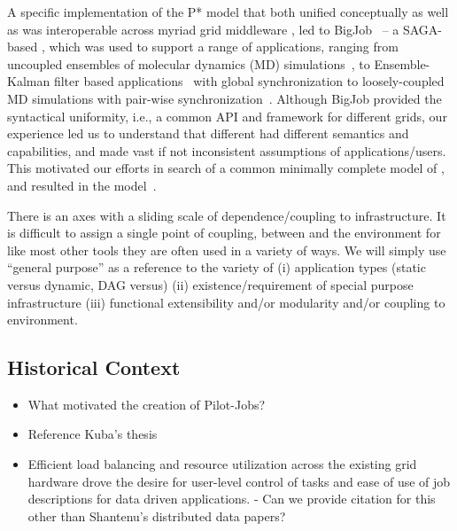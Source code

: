 \documentclass{sig-alternate}
\begin{document}
A specific implementation of the P* model that both unified
conceptually as well as was interoperable across myriad grid
middleware , led to 
BigJob~\cite{saga_bigjob_condor_cloud} -- a
SAGA-based \pilotjob, which was used to support a range of
applications, ranging from uncoupled ensembles of molecular dynamics
(MD) simulations~\cite{saga_bigjob_condor_cloud}, to Ensemble-Kalman
filter based applications~\cite{gmac09} with global synchronization to
loosely-coupled MD simulations with pair-wise
synchronization~\cite{async_repex11}.  Although BigJob provided the
syntactical uniformity, i.e., a common API and framework for different
grids, our experience led us to understand that different \pilotjobs
had different semantics and capabilities, and made vast if not
inconsistent assumptions of applications/users. This motivated our
efforts in search of a common minimally complete model of \pilotjobs,
and resulted in the \pstar model~\cite{pstar12}. 




There is an axes with a sliding scale of dependence/coupling to
infrastructure.  It is difficult to assign a single point of coupling,
between \pilotjobs and the environment for like most other tools they
are often used in a variety of ways.  We will simply use ``general
purpose'' as a reference to the variety of (i) application types
(static versus dynamic, DAG versus) (ii) existence/requirement of
special purpose infrastructure (iii) functional extensibility and/or
modularity and/or coupling to environment.

\subsection{Historical Context}

\begin{itemize}
\item What motivated the creation of Pilot-Jobs?
\item Reference Kuba's thesis
\item Efficient load balancing and resource utilization across the existing grid hardware drove the desire for user-level control of tasks and ease of use of job descriptions for data driven applications. - Can we provide citation for this other than Shantenu's distributed data papers?
\end{itemize}
\end{document}
